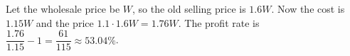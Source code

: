 Let the wholesale price be $W$, so the old selling price is $1.6W$. Now the cost is $1.15W$ and the price $1.1\cdot1.6W=1.76W$. The profit rate is $\dfrac{1.76}{1.15}-1=\dfrac{61}{115}\approx\boxed{53.04\%}$.
